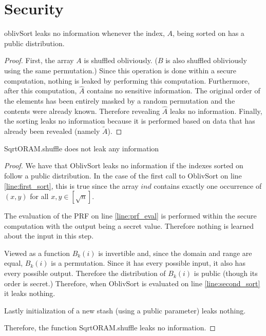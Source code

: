 
\section{Security}

\begin{lemma}
oblivSort leaks no information whenever the index, $A$, being sorted on
has a public distribution.
\end{lemma}

\begin{proof}
First, the array $A$ is shuffled obliviously.
($B$ is also shuffled obliviously using the same permutation.)
Since this operation is done within a secure computation,
nothing is leaked by performing this computation.
Furthermore, after this computation, $\hat{A}$ contains
no sensitive information.
The original order of the elements has been entirely masked by a
random permutation and the contents were already known.
Therefore revealing $\hat{A}$ leaks no information.
Finally, the sorting leaks no information because it is performed
based on data that has already been revealed (namely $\tilde{A}$).
\end{proof}

\begin{theorem}
SqrtORAM.shuffle does not leak any information
\end{theorem}

\begin{proof}
We have that OblivSort leaks no information if the indexes sorted on
follow a public distribution. In the case of the first call
to OblivSort on line \ref{line:first_sort}, this is true since
the array $ind$ contains exactly one occurrence of $(x, y)$ 
for all $x, y \in [\sqrt{n}]$.

The evaluation of the PRF on line \ref{line:prf_eval} is performed
within the secure computation with the output being a secret value.
Therefore nothing is learned about the input in this step.

Viewed as a function $B_k(i)$ is invertible and, since the domain and range
are equal, $B_k(i)$ is a permutation. 
Since it has every possible input, it also has every possible output.
Therefore the distribution of $B_k(i)$ is public (though its order is secret.)
Therefore, when OblivSort is evaluated on line \ref{line:second_sort} 
it leaks nothing.

Lastly initialization of a new stash (using a public parameter) leaks nothing.

Therefore, the function SqrtORAM.shuffle leaks no information.
\end{proof}

